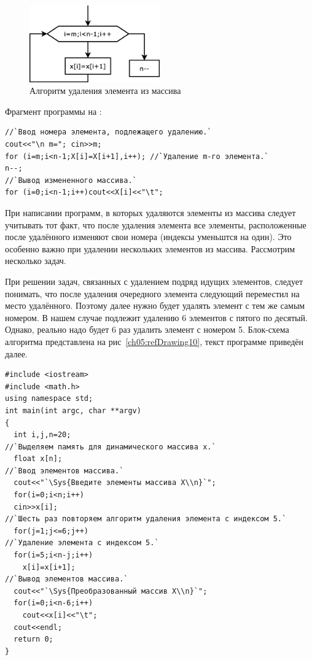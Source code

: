\begin{figure}[htb]
\begin{center}
\includegraphics[width=0.5\textwidth]{img/ris_5_10}
\caption{Алгоритм удаления элемента из массива}
\label{ch05:refDrawing9}
\end{center}
\end{figure}

Фрагмент программы на :
\begin{lstlisting}
//`Ввод номера элемента, подлежащего удалению.`
cout<<"\n m="; cin>>m; 
for (i=m;i<n-1;X[i]=X[i+1],i++); //`Удаление m-го элемента.`
n--;
//`Вывод измененного массива.`
for (i=0;i<n-1;i++)cout<<X[i]<<"\t"; 
\end{lstlisting}

При написании программ, в которых удаляются элементы из массива следует учитывать тот факт, что после удаления элемента
все элементы, расположенные после удалённого изменяют свои номера (индексы уменьштся на один). Это особенно важно
при удалении нескольких элементов из массива. Рассмотрим несколько задач.


При решении задач, связанных с удалением подряд идущих элементов, следует понимать, что после удаления очередного
элемента следующий переместил на место удалённого. Поэтому далее нужно будет удалять элемент с тем же самым номером. В
нашем случае подлежит удалению 6 элементов с пятого по десятый. Однако, реально надо будет 6 раз удалить элемент с
номером 5. Блок-схема алгоритма представлена на рис~\ref{ch05:refDrawing10}, текст программе приведён далее.
\begin{lstlisting}
#include <iostream>
#include <math.h>
using namespace std;
int main(int argc, char **argv)
{
  int i,j,n=20;
//`Выделяем память для динамического массива x.`
  float x[n];
//`Ввод элементов массива.`
  cout<<"`\Sys{Введите элементы массива X\\n}`";
  for(i=0;i<n;i++)
  cin>>x[i];
//`Шесть раз повторяем алгоритм удаления элемента с индексом 5.`
  for(j=1;j<=6;j++)
//`Удаление элемента с индексом 5.`
  for(i=5;i<n-j;i++)
    x[i]=x[i+1];
//`Вывод элементов массива.`
  cout<<"`\Sys{Преобразованный массив X\\n}`";
  for(i=0;i<n-6;i++)
    cout<<x[i]<<"\t";
  cout<<endl;
  return 0;
}
\end{lstlisting}

